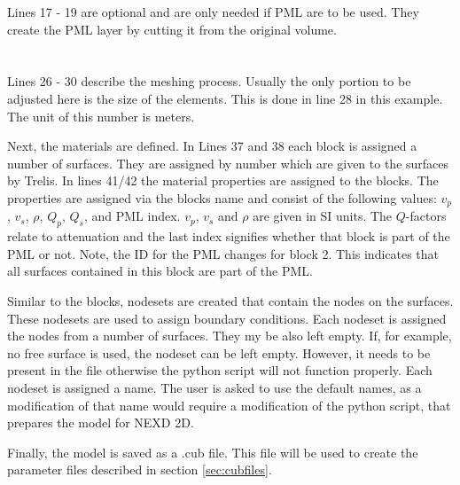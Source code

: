     	Lines 17 - 19 are optional and are only needed if PML are to be used. They create the PML layer by cutting it from the original volume. \\
		\\    	
    	 \\
    	
    	Lines 26 - 30 describe the meshing process. Usually the only portion to be adjusted here is the size of the elements. This is done in line 28 in this example. The unit of this number is meters.
    	
    	Next, the materials are defined. In Lines 37 and 38 each block is assigned a number of surfaces. They are assigned by number which are given to the surfaces by Trelis.
    	In lines 41/42 the material properties are assigned to the blocks. The properties are assigned via the blocks name and consist of the following values: $v_p$, $v_s$, $\rho$, $Q_p$, $Q_s$, and PML index. $v_p$, $v_s$ and $\rho$ are given in SI units. The $Q$-factors relate to attenuation and the last index signifies whether that block is part of the PML or not. Note, the ID for the PML changes for block 2. This indicates that all surfaces contained in this block are part of the PML.
    	
    	Similar to the blocks, nodesets are created that contain the nodes on the surfaces. These nodesets are used to assign boundary conditions. Each nodeset is assigned the nodes from a number of surfaces. They my be also left empty. If, for example, no free surface is used, the nodeset can be left empty. However, it needs to be present in the file otherwise the python script  will not function properly. Each nodeset is assigned a name. The user is asked to use the default names, as a modification of that name would require a modification of the python script, that prepares the model for NEXD 2D.
    	  
    	Finally, the model is saved as a .cub file. This file will be used to create the parameter files described in section \ref{sec:cubfiles}.
    	
